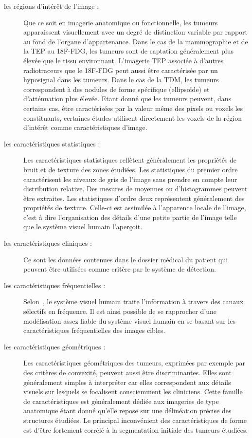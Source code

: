 \begin{description}
\item[les régions d’intérêt de l’image :] Que ce soit en imagerie anatomique ou fonctionnelle, les tumeurs apparaissent visuellement avec un degré de distinction variable par rapport au fond de l’organe d’appartenance. Dans le cas de la mammographie et de la TEP au 18F-FDG, les tumeurs sont de captation généralement plus élevée que le tissu environnant. L’imagerie TEP associée à d’autres radiotraceurs que le 18F-FDG peut aussi être caractérisée par un hyposignal dans les tumeurs. Dans le cas de la TDM, les tumeurs correspondent à des nodules de forme spécifique (ellipsoïde) et d’atténuation plus élevée. Etant donné que les tumeurs peuvent, dans certains cas, être caractérisées par la valeur même des pixels ou voxels les constituants, certaines études utilisent directement les voxels de la région d'intérêt comme caractéristiques d’image.
\item[les caractéristiques statistiques : ] Les caractéristiques statistiques reflètent généralement les propriétés de bruit et de texture des zones étudiées. Les statistiques du premier ordre caractérisent les niveaux de gris de l’image sans prendre en compte leur distribution relative. Des mesures de moyennes ou d’histogrammes peuvent être extraites. Les statistiques d’ordre deux représentent généralement des propriétés de texture. Celle-ci est assimilée à l’apparence locale de l’image, c’est à dire l’organisation des détails d’une petite partie de l’image telle que le système visuel humain l’aperçoit.
\item[les caractéristiques cliniques : ] Ce sont les données contenues dans le dossier médical du patient qui peuvent être utilisées comme critère par le système de détection.
\item[les caractéristiques fréquentielles :] Selon~\cite{sachs1971spatial}, le système visuel humain traite l’information à travers des canaux sélectifs en fréquence. Il est ainsi possible de se rapprocher d’une modélisation assez fiable du système visuel humain en se basant sur les caractéristiques fréquentielles des images cibles.
\item[les caractéristiques géométriques :] Les caractéristiques géométriques des tumeurs, exprimées par exemple par des critères de convexité, peuvent aussi être discriminantes. Elles sont généralement simples à interpréter car elles correspondent aux détails visuels sur lesquels se focalisent consciemment les cliniciens. Cette famille de caractéristiques est généralement dédiée aux imageries de type anatomique étant donné qu’elle repose sur une délinéation précise des structures étudiées. Le principal inconvénient des caractéristiques de forme est d’être fortement corrélé à la segmentation initiale des tumeurs étudiées.
\end{description}



